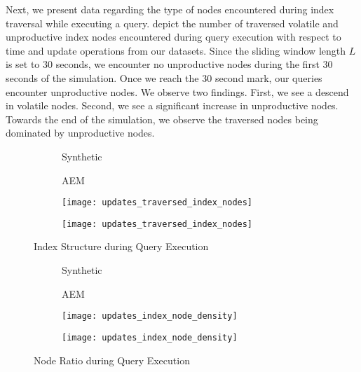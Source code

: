 \documentclass[abstracton,12pt]{scrartcl}
\theoremstyle{definition}
\begin{document}
Next, we present data regarding the type of nodes encountered during index traversal while
executing a query.
 depict
the number of traversed volatile and unproductive index nodes encountered during query
execution with respect to time and update operations from our datasets.
Since the sliding window length $L$ is set to $30$ seconds, we encounter no
unproductive nodes during the first $30$ seconds of the simulation. Once we
reach the $30$ second mark, our queries encounter unproductive nodes. We observe
two findings. First, we see a descend in volatile nodes. Second, we see a
significant increase in unproductive nodes. Towards the end of the simulation,
we observe the traversed nodes being dominated by unproductive nodes. 

\begin{figure}[h]
  \centering
  \begin{subfigure}{0.49\linewidth}
    \centering
    Synthetic
  \end{subfigure}
  \begin{subfigure}{0.49\linewidth}
    \centering
    AEM
  \end{subfigure}
  \begin{subfigure}{0.49\linewidth}
    \centering
    \texttt{[image: updates\_traversed\_index\_nodes]}
    \caption{}
    \label{fig:trav_nodes_synthetic_updates}
  \end{subfigure}
  \begin{subfigure}{0.49\linewidth}
    \centering
    \texttt{[image: updates\_traversed\_index\_nodes]}
    \caption{}
    \label{fig:trav_nodes_aem_updates}
  \end{subfigure}
  \caption{Index Structure during Query Execution}
\end{figure}

\begin{figure}[h]
 \centering
  \begin{subfigure}{0.49\linewidth}
    \centering
    Synthetic
  \end{subfigure}
  \begin{subfigure}{0.49\linewidth}
    \centering
    AEM
  \end{subfigure}
  \begin{subfigure}{0.49\linewidth}
    \centering
    \texttt{[image: updates\_index\_node\_density]}
    \caption{}
    \label{fig:trav_node_density_synthetic_updates}
  \end{subfigure}
  \begin{subfigure}{0.49\linewidth}
    \centering
    \texttt{[image: updates\_index\_node\_density]}
    \caption{}
    \label{fig:trav_node_density_aem_updates}
  \end{subfigure}
 \caption{Node Ratio during Query Execution}
\end{figure}
\end{document}
